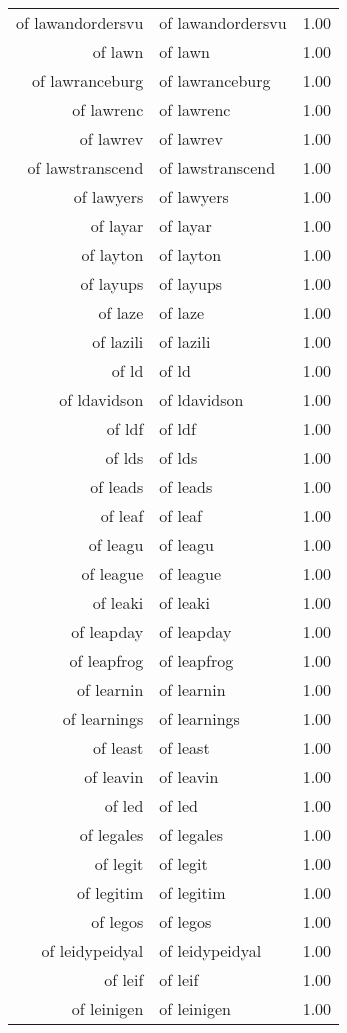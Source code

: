 \begin{table}[ht]
\begin{tabular}{rlr}
  of lawandordersvu & of lawandordersvu & 1.00 \\ 
  of lawn & of lawn & 1.00 \\ 
  of lawranceburg & of lawranceburg & 1.00 \\ 
  of lawrenc & of lawrenc & 1.00 \\ 
  of lawrev & of lawrev & 1.00 \\ 
  of lawstranscend & of lawstranscend & 1.00 \\ 
  of lawyers & of lawyers & 1.00 \\ 
  of layar & of layar & 1.00 \\ 
  of layton & of layton & 1.00 \\ 
  of layups & of layups & 1.00 \\ 
  of laze & of laze & 1.00 \\ 
  of lazili & of lazili & 1.00 \\ 
  of ld & of ld & 1.00 \\ 
  of ldavidson & of ldavidson & 1.00 \\ 
  of ldf & of ldf & 1.00 \\ 
  of lds & of lds & 1.00 \\ 
  of leads & of leads & 1.00 \\ 
  of leaf & of leaf & 1.00 \\ 
  of leagu & of leagu & 1.00 \\ 
  of league & of league & 1.00 \\ 
  of leaki & of leaki & 1.00 \\ 
  of leapday & of leapday & 1.00 \\ 
  of leapfrog & of leapfrog & 1.00 \\ 
  of learnin & of learnin & 1.00 \\ 
  of learnings & of learnings & 1.00 \\ 
  of least & of least & 1.00 \\ 
  of leavin & of leavin & 1.00 \\ 
  of led & of led & 1.00 \\ 
  of legales & of legales & 1.00 \\ 
  of legit & of legit & 1.00 \\ 
  of legitim & of legitim & 1.00 \\ 
  of legos & of legos & 1.00 \\ 
  of leidypeidyal & of leidypeidyal & 1.00 \\ 
  of leif & of leif & 1.00 \\ 
  of leinigen & of leinigen & 1.00 \\ 

\end{tabular}
\end{table}
